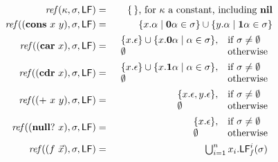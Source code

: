 \begin{figure}[t]  
\begin{eqnarray*}
\mathit{ref\/}(\kappa,\sigma,\Lfonly)
          &=& \{\,\} \mbox{, for $\kappa$ a constant, including $\NIL$}\\
\mathit{ref\/}((\CONS~x~y),\sigma,\Lfonly)
          &=& \{x.\alpha \mid \acar\alpha \in \sigma\} \cup \{y.\alpha \mid \acdr\alpha \in \sigma\} \\
\mathit{ref\/}((\CAR~x),\sigma,\Lfonly)
          &=&    \begin{array}{l l}
                    \{x.\epsilon\} \cup \{x.\acar\alpha \mid \alpha \in
\sigma\}, & \mbox{if}~\sigma \ne \emptyset\\
                    \emptyset  & \mbox{otherwise}
                 \end{array} \\
\mathit{ref\/}((\CDR~x),\sigma,\Lfonly)
          &=&    \begin{array}{l l}
                    \{x.\epsilon\} \cup \{x.\acdr\alpha \mid \alpha \in
\sigma\}, & \mbox{if}~\sigma \ne \emptyset\\
                    \emptyset  & \mbox{otherwise}
                 \end{array} \\
\mathit{ref\/}((\PRIM~x~y),\sigma,\Lfonly)
          &=&    \begin{array}{l l}
                    \{x.\epsilon, y.\epsilon\},  & \mbox{if}~\sigma \ne \emptyset\\
                    \emptyset  & \mbox{otherwise}
                 \end{array} \\
\mathit{ref\/}((\NULLQ~x),\sigma,\Lfonly)
          &=&    \begin{array}{l l}
                    \{x.\epsilon\},  & \mbox{if}~\sigma \ne \emptyset\\
                    \emptyset  & \mbox{otherwise}
                 \end{array} \\
\mathit{ref\/}((f~\myvec{x}),\sigma,\Lfonly)
          &=&  \begin{array}{@{}l}  %
               \bigcup_{i=1}^n x_i.\Lf{f}{i}{\sigma}
               \end{array}
\\[1ex]

\end{eqnarray*}
\end{figure}
